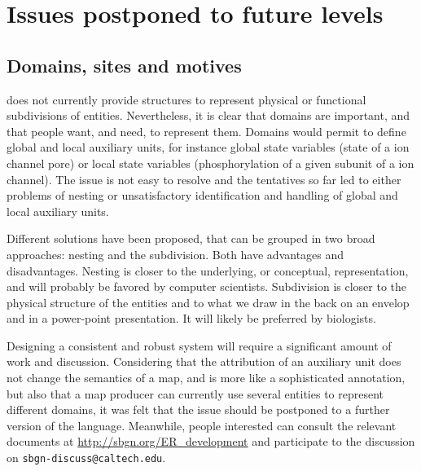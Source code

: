 \chapter{Issues postponed to future levels}\label{sec:postponed}

\section{Domains, sites and motives}\label{sec:unresolved_domain}

\SBGNERLone does not currently provide structures to represent physical or functional subdivisions of entities. Nevertheless, it is clear that domains are important, and that people want, and need, to represent them. 
Domains would permit to define global and local auxiliary units, for instance global state variables (state of a ion channel pore) or local state variables (phosphorylation of a given subunit of a ion channel). The issue is not easy to resolve and the tentatives so far led to either problems of nesting or unsatisfactory identification and handling of global and local auxiliary units. 

Different solutions have been proposed, that can be grouped in two broad approaches: nesting and the subdivision. Both have advantages and disadvantages. Nesting is closer to the underlying, or conceptual, representation, and will probably be favored by computer scientists. Subdivision is closer to the physical structure of the entities and to what we draw in the back on an envelop and in a power-point presentation. It will likely be preferred by biologists. 

Designing a consistent and robust system will require a significant amount of work and discussion. Considering that the attribution of an auxiliary unit does not change the semantics of a map, and is more like a sophisticated annotation, but also that a map producer can currently use several entities to represent different domains, it was felt that the issue should be postponed to a further version of the language. Meanwhile, people interested can consult the relevant documents at \url{http://sbgn.org/ER_development} and participate to the discussion on \texttt{sbgn-discuss@caltech.edu}.

